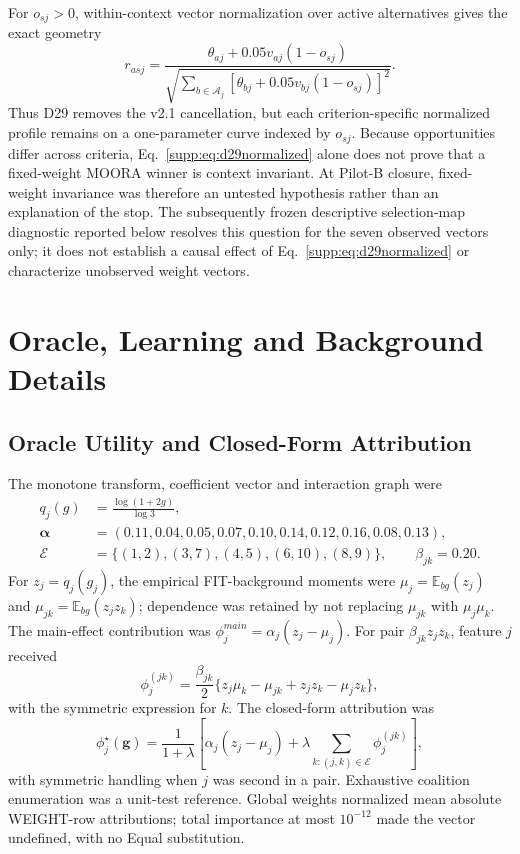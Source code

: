 \documentclass[runningheads]{llncs}
\newcommand{\E}{\mathbb{E}}
\begin{document}
For $o_{sj}>0$, within-context vector normalization over active alternatives gives the exact
geometry
\begin{equation}
r_{asj}=
\frac{\theta_{aj}+0.05v_{aj}(1-o_{sj})}
{\sqrt{\sum_{b\in\mathcal A_j}
[\theta_{bj}+0.05v_{bj}(1-o_{sj})]^2}}.
\label{supp:eq:d29normalized}
\end{equation}
Thus D29 removes the v2.1 cancellation, but each criterion-specific normalized profile remains
on a one-parameter curve indexed by $o_{sj}$. Because opportunities differ across criteria,
Eq.~\eqref{supp:eq:d29normalized} alone does not prove that a fixed-weight MOORA winner is
context invariant. At Pilot-B closure, fixed-weight invariance was therefore an untested
hypothesis rather than an explanation of the stop. The subsequently frozen descriptive
selection-map diagnostic reported below resolves this question for the seven observed vectors
only; it does not establish a causal effect of Eq.~\eqref{supp:eq:d29normalized} or characterize
unobserved weight vectors.

\section{Oracle, Learning and Background Details}

\subsection{Oracle Utility and Closed-Form Attribution}

The monotone transform, coefficient vector and interaction graph were
\begin{align}
q_j(g)&=\frac{\log(1+2g)}{\log3},\nonumber\\
\boldsymbol\alpha&=(0.11,0.04,0.05,0.07,0.10,0.14,0.12,0.16,0.08,0.13),\nonumber\\
\mathcal E&=\{(1,2),(3,7),(4,5),(6,10),(8,9)\},\qquad \beta_{jk}=0.20.
\label{supp:eq:oraclecomponents}
\end{align}
For $z_j=q_j(g_j)$, the empirical FIT-background moments were
$\mu_j=\E_{bg}(z_j)$ and $\mu_{jk}=\E_{bg}(z_jz_k)$; dependence was retained by not replacing
$\mu_{jk}$ with $\mu_j\mu_k$. The main-effect contribution was
$\phi_j^{main}=\alpha_j(z_j-\mu_j)$. For pair $\beta_{jk}z_jz_k$, feature $j$ received
\begin{equation}
\phi_j^{(jk)}=\frac{\beta_{jk}}{2}
\{z_j\mu_k-\mu_{jk}+z_jz_k-\mu_jz_k\},
\label{supp:eq:pairshap}
\end{equation}
with the symmetric expression for $k$. The closed-form attribution was
\begin{equation}
\phi_j^\star(\mathbf g)=\frac{1}{1+\lambda}
\left[\alpha_j(z_j-\mu_j)+\lambda\!\sum_{k:(j,k)\in\mathcal E}\phi_j^{(jk)}\right],
\label{supp:eq:closedshap}
\end{equation}
with symmetric handling when $j$ was second in a pair. Exhaustive coalition enumeration was a
unit-test reference. Global weights normalized mean absolute WEIGHT-row attributions; total
importance at most $10^{-12}$ made the vector undefined, with no Equal substitution.
\end{document}
